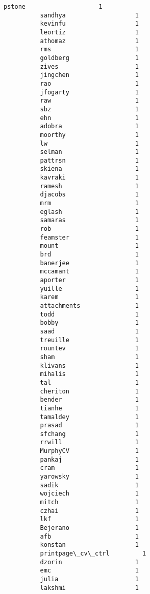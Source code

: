 \documentclass[11pt]{article}
\begin{document}
\begin{Verbatim}[commandchars=\\\{\}]
          pstone                    1
          sandhya                   1
          kevinfu                   1
          leortiz                   1
          athomaz                   1
          rms                       1
          goldberg                  1
          zives                     1
          jingchen                  1
          rao                       1
          jfogarty                  1
          raw                       1
          sbz                       1
          ehn                       1
          adobra                    1
          moorthy                   1
          lw                        1
          selman                    1
          pattrsn                   1
          skiena                    1
          kavraki                   1
          ramesh                    1
          djacobs                   1
          mrm                       1
          eglash                    1
          samaras                   1
          rob                       1
          feamster                  1
          mount                     1
          brd                       1
          banerjee                  1
          mccamant                  1
          aporter                   1
          yuille                    1
          karem                     1
          attachments               1
          todd                      1
          bobby                     1
          saad                      1
          treuille                  1
          rountev                   1
          sham                      1
          klivans                   1
          mihalis                   1
          tal                       1
          cheriton                  1
          bender                    1
          tianhe                    1
          tamaldey                  1
          prasad                    1
          sfchang                   1
          rrwill                    1
          MurphyCV                  1
          pankaj                    1
          cram                      1
          yarowsky                  1
          sadik                     1
          wojciech                  1
          mitch                     1
          czhai                     1
          lkf                       1
          Bejerano                  1
          afb                       1
          konstan                   1
          printpage\_cv\_ctrl         1
          dzorin                    1
          emc                       1
          julia                     1
          lakshmi                   1

\end{Verbatim}
\end{document}
